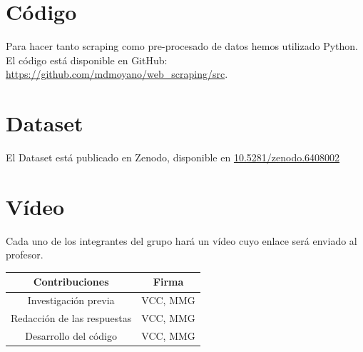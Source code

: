 \documentclass[IB]{PlantillaPACnova_Est}
\begin{document}


\section{Código}

Para hacer tanto scraping como pre-procesado de datos hemos utilizado Python. El código está disponible en GitHub: \url{https://github.com/mdmoyano/web_scraping/src}.

\section{Dataset}

El Dataset está publicado en Zenodo, disponible en  \url{10.5281/zenodo.6408002}


\section{Vídeo}

Cada uno de los integrantes del grupo hará un vídeo cuyo enlace será enviado al profesor.\\

\begin{center}
\begin{tabular}{|c|c|}
\hline
\textbf{Contribuciones} & \textbf{Firma} \\ 
\hline
 Investigación previa & VCC, MMG \\ 
 \hline
 Redacción de las respuestas & VCC, MMG \\
 \hline 
 Desarrollo del código & VCC, MMG \\
 \hline
\end{tabular}

\end{center}


%
%
\newpage

 
\listoffigures
\end{document}
